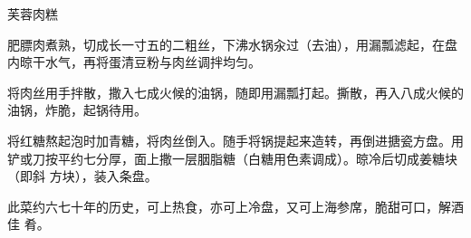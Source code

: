 %
%
%
%
%
%
%
\begin{recipe}{芙蓉肉糕}

\ingredients


\preparation

\step 肥膘肉煮熟，切成长一寸五的二粗丝，下沸水锅汆过（去油），用漏瓢滤起，在盘
内晾干水气，再将蛋清豆粉与肉丝调拌均匀。

\step 将肉丝用手拌散，撒入七成火候的油锅，随即用漏瓢打起。撕散，再入八成火候的
油锅，炸脆，起锅待用。

\step 将红糖熬起泡时加青糖，将肉丝倒入。随手将锅提起来造转，再倒进搪瓷方盘。用
铲或刀按平约七分厚，面上撒一层胭脂糖（白糖用色素调成）。晾冷后切成姜糖块（即斜
方块），装入条盘。

\features

此菜约六七十年的历史，可上热食，亦可上冷盘，又可上海参席，脆甜可口，解酒佳
肴。

\end{recipe}


